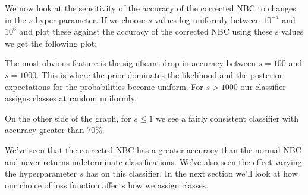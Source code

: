 We now look at the sensitivity of the accuracy of the corrected NBC to changes in the $s$ hyper-parameter.
If we choose $s$ values log uniformly between $10^{-4}$ and $10^{6}$ and plot these against the accuracy of the corrected NBC using these s values we get the following plot:
\begin{center}
\end{center}

The most obvious feature is the significant drop in accuracy between $s=100$ and $s=1000$.
This is where the prior dominates the likelihood and the posterior expectations for the probabilities become uniform.
For $s>1000$ our classifier assigns classes at random uniformly.

On the other side of the graph, for $s \leq 1$ we see a fairly consistent classifier with accuracy greater than 70\%.

We've seen that the corrected NBC has a greater accuracy than the normal NBC and never returns indeterminate classifications.
We've also seen the effect varying the hyperparameter $s$ has on this classifier.
In the next section we'll look at how our choice of loss function affects how we assign classes.